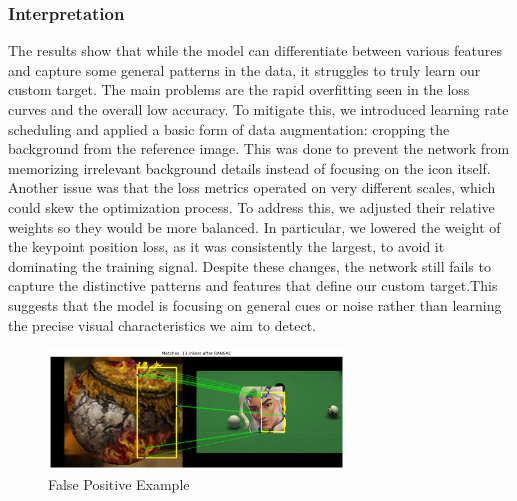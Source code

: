 \subsubsection{Interpretation}
The results show that while the model can differentiate between various
features and capture some general patterns in the data, it struggles to truly
learn our custom target. The main problems are the rapid overfitting seen in
the loss curves and the overall low accuracy. To mitigate this, we introduced
learning rate scheduling and applied a basic form of data augmentation:
cropping the background from the reference image. This was done to prevent the
network from memorizing irrelevant background details instead of focusing on
the icon itself. Another issue was that the loss metrics operated on very
different scales, which could skew the optimization process. To address this,
we adjusted their relative weights so they would be more balanced. In
particular, we lowered the weight of the keypoint position loss, as it was
consistently the largest, to avoid it dominating the training signal. Despite
these changes, the network still fails to capture the distinctive patterns and
features that define our custom target.This suggests that the model is
focusing on general cues or noise rather than learning the precise visual
characteristics we aim to detect.
\begin{figure}[H]
    \centering
    \includegraphics[width=0.7\textwidth]{ressources/false_positive_1.png}
    \caption{False Positive Example}
    \label{fig:false_positive_1}
\end{figure}

